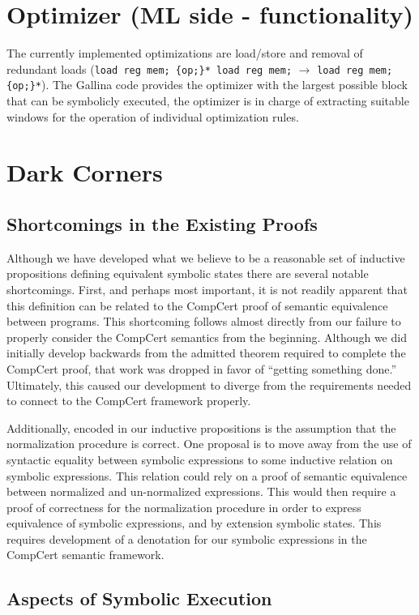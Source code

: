 \documentclass{article}
\begin{document}
\section{Optimizer (ML side - functionality)}
The currently implemented optimizations are load/store and removal of
redundant loads ({\tt load reg mem; \{op;\}* load reg mem;}
$\rightarrow$ {\tt load reg mem; \{op;\}*}).  The Gallina code
provides the optimizer with the largest possible block that can be
symbolicly executed, the optimizer is in charge of extracting suitable
windows for the operation of individual optimization rules.

\section{Dark Corners}

\subsection{Shortcomings in the Existing Proofs}
Although we have developed what we believe to be a reasonable set of
inductive propositions defining equivalent symbolic states there are
several notable shortcomings. First, and perhaps most important, it is
not readily apparent that this definition can be related to the
CompCert proof of semantic equivalence between programs. This
shortcoming follows almost directly from our failure to properly
consider the CompCert semantics from the beginning. Although we did
initially develop backwards from the admitted theorem required to
complete the CompCert proof, that work was dropped in favor of
``getting something done.'' Ultimately, this caused our development to
diverge from the requirements needed to connect to the CompCert
framework properly.

Additionally, encoded in our inductive propositions is the assumption
that the normalization procedure is correct. One proposal is to move
away from the use of syntactic equality between symbolic expressions to
some inductive relation on symbolic expressions. This relation could
rely on a proof of semantic equivalence between normalized and
un-normalized  expressions. This would then require a proof of
correctness for the normalization procedure in order to express
equivalence of symbolic expressions, and by extension symbolic
states. This requires development of a denotation for our symbolic
expressions in the CompCert semantic framework.


\subsection{Aspects of Symbolic Execution}
\end{document}

